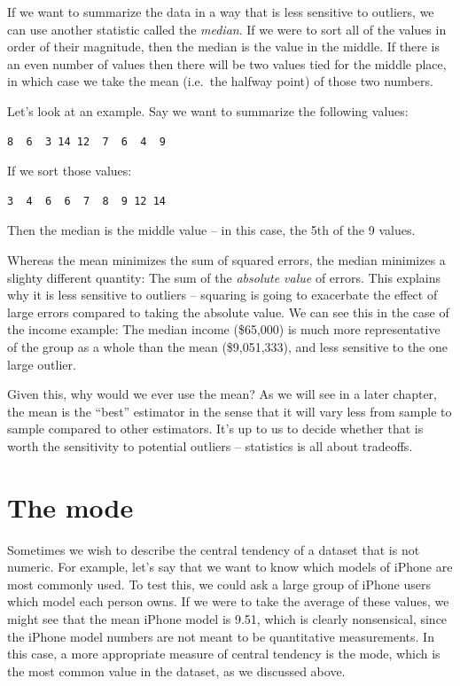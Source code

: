 \documentclass[
  12pt,
]{book}
\begin{document}
If we want to summarize the data in a way that is less sensitive to outliers, we can use another statistic called the \emph{median}. If we were to sort all of the values in order of their magnitude, then the median is the value in the middle. If there is an even number of values then there will be two values tied for the middle place, in which case we take the mean (i.e.~the halfway point) of those two numbers.

Let's look at an example. Say we want to summarize the following values:

\begin{verbatim}
8  6  3 14 12  7  6  4  9
\end{verbatim}

If we sort those values:

\begin{verbatim}
3  4  6  6  7  8  9 12 14
\end{verbatim}

Then the median is the middle value -- in this case, the 5th of the 9 values.

Whereas the mean minimizes the sum of squared errors, the median minimizes a slighty different quantity: The sum of the \emph{absolute value} of errors. This explains why it is less sensitive to outliers -- squaring is going to exacerbate the effect of large errors compared to taking the absolute value. We can see this in the case of the income example: The median income (\$65,000) is much more representative of the group as a whole than the mean (\$9,051,333), and less sensitive to the one large outlier.

Given this, why would we ever use the mean? As we will see in a later chapter, the mean is the ``best'' estimator in the sense that it will vary less from sample to sample compared to other estimators. It's up to us to decide whether that is worth the sensitivity to potential outliers -- statistics is all about tradeoffs.

\hypertarget{the-mode}{%
\section{The mode}\label{the-mode}}

Sometimes we wish to describe the central tendency of a dataset that is not numeric. For example, let's say that we want to know which models of iPhone are most commonly used. To test this, we could ask a large group of iPhone users which model each person owns. If we were to take the average of these values, we might see that the mean iPhone model is 9.51, which is clearly nonsensical, since the iPhone model numbers are not meant to be quantitative measurements. In this case, a more appropriate measure of central tendency is the mode, which is the most common value in the dataset, as we discussed above.
\end{document}
